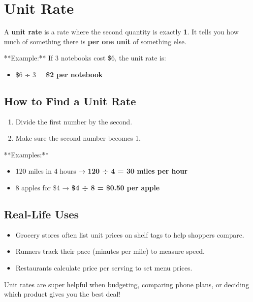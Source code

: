 \cleardoublepage
\section{Unit Rate}

A \textbf{unit rate} is a rate where the second quantity is exactly \textbf{1}. It tells you how much of something there is \textbf{per one unit} of something else.

**Example:**  
If 3 notebooks cost \$6, the unit rate is:
\begin{itemize}
  \item \$6 ÷ 3 = \textbf{\$2 per notebook}
\end{itemize}

\subsection*{How to Find a Unit Rate}

\begin{enumerate}
  \item Divide the first number by the second.
  \item Make sure the second number becomes 1.
\end{enumerate}

**Examples:**
\begin{itemize}
  \item 120 miles in 4 hours → \textbf{120 ÷ 4 = 30 miles per hour}
  \item 8 apples for \$4 → \textbf{\$4 ÷ 8 = \$0.50 per apple}
\end{itemize}

\subsection*{Real-Life Uses}

\begin{itemize}
  \item Grocery stores often list unit prices on shelf tags to help shoppers compare.
  \item Runners track their pace (minutes per mile) to measure speed.
  \item Restaurants calculate price per serving to set menu prices.
\end{itemize}

Unit rates are super helpful when budgeting, comparing phone plans, or deciding which product gives you the best deal!





